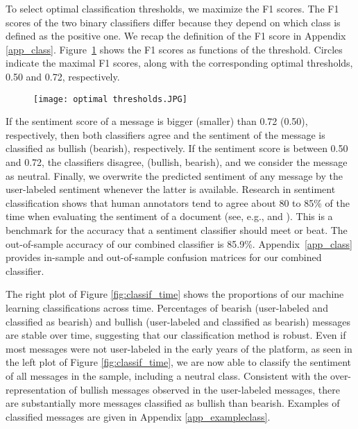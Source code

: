 To select optimal classification thresholds, we maximize the F1 scores. The F1 scores of the two binary classifiers differ because they depend on which class is defined as the positive one. We recap the definition of the F1 score in Appendix \ref{app_class}. Figure~\ref{fig:optimal_thresholds} shows the F1 scores as functions of the threshold. Circles indicate the maximal F1 scores, along with the corresponding optimal thresholds, 0.50 and 0.72, respectively. 

\begin{figure}[h]
    \centering
    \texttt{[image: optimal thresholds.JPG]}
    \label{fig:optimal_thresholds}
\end{figure}

If the sentiment score of a message is bigger (smaller) than 0.72 (0.50), respectively, then both classifiers agree and the sentiment of the message is classified as bullish (bearish), respectively. If the sentiment score is between 0.50 and 0.72, the classifiers disagree, (bullish, bearish), and we consider the message as neutral. Finally, we overwrite the predicted sentiment of any message by the user-labeled sentiment whenever the latter is available. Research in sentiment classification shows that human annotators tend to agree about 80 to 85\% of the time when evaluating the sentiment of a document (see, e.g., \citet{wilson2005recognizing} and \citet{chen2020large}). This is a benchmark for the accuracy that a sentiment classifier should meet or beat. The out-of-sample accuracy of our combined classifier is 85.9\%. Appendix~\ref{app_class} provides in-sample and out-of-sample confusion matrices for our combined classifier.

The right plot of Figure \ref{fig:classif_time} shows the proportions of our machine learning classifications across time. Percentages of bearish (user-labeled and classified as bearish) and bullish (user-labeled and classified as bearish) messages are stable over time, suggesting that our classification method is robust. Even if most messages were not user-labeled in the early years of the platform, as seen in the left plot of Figure \ref{fig:classif_time}, we are now able to classify the sentiment of all messages in the sample, including a neutral class. Consistent with the over-representation of bullish messages observed in the user-labeled messages, there are substantially more messages classified as bullish than bearish. Examples of classified messages are given in Appendix \ref{app_exampleclass}.

